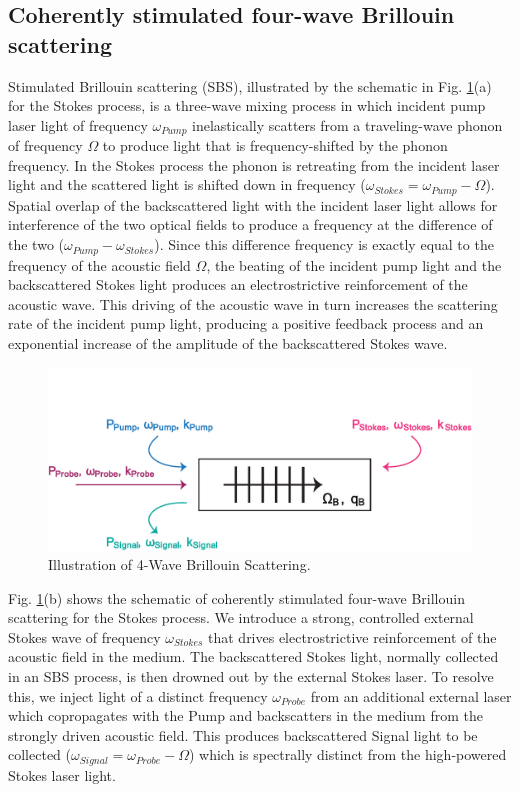 \documentclass[%
  reprint,
  superscriptaddress,
  amsmath,amssymb,
  aps,
  prapplied,
]{revtex4-2}
\begin{document}
\subsection*{Coherently stimulated four-wave Brillouin scattering}
\label{Theoretical Framework:Coherently stimulated five-wave Brillouin scattering}
Stimulated Brillouin scattering (SBS), illustrated by the schematic in Fig. \ref{fig:4-Wave-Brillouin-Scattering}(a) for the Stokes process, is a three-wave mixing process in which incident pump laser light of frequency $\omega_{Pump}$ inelastically scatters from a traveling-wave phonon of frequency $\Omega$ to produce light that is frequency-shifted by the phonon frequency. In the Stokes process the phonon is retreating from the incident laser light and the scattered light is shifted down in frequency ($\omega_{Stokes} = \omega_{Pump} - \Omega$). Spatial overlap of the backscattered light with the incident laser light allows for interference of the two optical fields to produce a frequency at the difference of the two ($\omega_{Pump} - \omega_{Stokes}$). Since this difference frequency is exactly equal to the frequency of the acoustic field $\Omega$, the beating of the incident pump light and the backscattered Stokes light produces an electrostrictive reinforcement of the acoustic wave. This driving of the acoustic wave in turn increases the scattering rate of the incident pump light, producing a positive feedback process and an exponential increase of the amplitude of the backscattered Stokes wave.

\begin{figure}[t]
  \centering
  \includegraphics[width=.5\textwidth]{4-Wave-Brillouin-Scattering.pdf}
  \caption{Illustration of 4-Wave Brillouin Scattering.}
  \label{fig:4-Wave-Brillouin-Scattering}
\end{figure}

Fig. \ref{fig:4-Wave-Brillouin-Scattering}(b) shows the schematic of coherently stimulated four-wave Brillouin scattering for the Stokes process. We introduce a strong, controlled external Stokes wave of frequency $\omega_{Stokes}$ that drives electrostrictive reinforcement of the acoustic field in the medium. The backscattered Stokes light, normally collected in an SBS process, is then drowned out by the external Stokes laser. To resolve this, we inject light of a distinct frequency $\omega_{Probe}$ from an additional external laser which copropagates with the Pump and backscatters in the medium from the strongly driven acoustic field. This produces backscattered Signal light to be collected ($\omega_{Signal} = \omega_{Probe} - \Omega$) which is spectrally distinct from the high-powered Stokes laser light.
\end{document}
